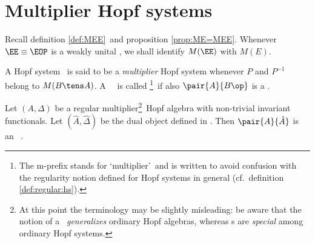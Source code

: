 \section{Multiplier Hopf systems}
\label{par:Multiplier_Hopf_systems}


Recall definition \ref{def:MEE}\ and proposition \ref{prop:ME=MEE}\@.
Whenever $\EE \equiv \EOP$ is a weakly unital \context, we shall identify $M(\EE)$ with $M(E)$.

\begin{defn_sec}
A Hopf system \pairAB\ is said to be a {\em multiplier\/} Hopf system whenever
$P$ and $P^{-1}$ belong to $M(B \tens A)$. A \mhs\ \pairAB\ is called
{\em \mr}\footnote{The m-prefix stands for \lq multiplier\rq\ and is written to
avoid confusion with the regularity notion defined for Hopf systems in general
(cf.\ definition \ref{def:regular:hs}).}\
if also $\pair{A}{B\op}$ is a \mhs\@.
\end{defn_sec}


\begin{prop_sec}
Let\/ $(A,\Delta)$ be a regular multiplier\footnote{At this point the terminology
may be slightly misleading: be aware that the notion of a \mha\ {\em generalizes\/}
ordinary Hopf algebras, whereas \mhs s are {\em special\/} among ordinary Hopf systems.}\
Hopf algebra with non-trivial invariant functionals.
Let\/ $(\hat{A},\hat{\Delta})$ be the dual object defined in \cite{Fons:AFGD:proc,Fons:AFGD}\@.
Then $\pair{A}{\hat{A}}$ is an \mr\ \mhs.
\end{prop_sec}

